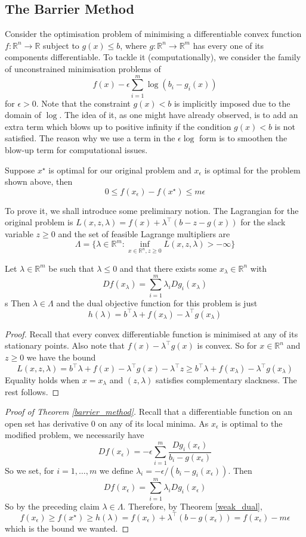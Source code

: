 \subsection{The Barrier Method}
Consider the optimisation problem of minimising a differentiable convex function $f:\mathbb R^n\to\mathbb R$ subject to $g(x)\le b$, where $g:\mathbb R^n\to\mathbb R^m$ has every one of its components differentiable.
To tackle it (computationally), we consider the family of unconstrained minimisation problems of
$$f(x)-\epsilon\sum_{i=1}^m\log(b_i-g_i(x))$$
for $\epsilon>0$.
Note that the constraint $g(x)<b$ is implicitly imposed due to the domain of $\log$.
The idea of it, as one might have already observed, is to add an extra term which blows up to positive infinity if the condition $g(x)<b$ is not satisfied.
The reason why we use a term in the $\epsilon\log$ form is to smoothen the blow-up term for computational issues.
\begin{theorem}\label{barrier_method}
    Suppose $x^\star$ is optimal for our original problem and $x_\epsilon$ is optimal for the problem shown above, then
    $$0\le f(x_\epsilon)-f(x^\star)\le m\epsilon$$
\end{theorem}
To prove it, we shall introduce some preliminary notion.
The Lagrangian for the original problem is $L(x,z,\lambda)=f(x)+\lambda^\top (b-z-g(x))$ for the slack variable $z\ge0$ and the set of feasible Lagrange multipliers are
$$\Lambda=\{\lambda\in\mathbb R^m:\inf_{x\in\mathbb R^n,z\ge 0}L(x,z,\lambda)>-\infty\}$$
\begin{claim}
    Let $\lambda\in\mathbb R^m$ be such that $\lambda\le 0$ and that there exists some $x_\lambda\in\mathbb R^n$ with
    $$Df(x_\lambda)=\sum_{i=1}^m\lambda_iDg_i(x_\lambda)$$s
    Then $\lambda\in\Lambda$ and the dual objective function for this problem is just
    $$h(\lambda)=b^\top\lambda+f(x_\lambda)-\lambda^\top g(x_\lambda)$$
\end{claim}
\begin{proof}
    Recall that every convex differentiable function is minimised at any of its stationary points.
    Also note that $f(x)-\lambda^\top g(x)$ is convex.
    So for $x\in\mathbb R^n$ and $z\ge 0$ we have the bound
    $$L(x,z,\lambda)=b^\top\lambda+f(x)-\lambda^\top g(x)-\lambda^\top z\ge b^\top\lambda+f(x_\lambda)-\lambda^\top g(x_\lambda)$$
    Equality holds when $x=x_\lambda$ and $(z,\lambda)$ satisfies complementary slackness.
    The rest follows.
\end{proof}
\begin{proof}[Proof of Theorem \ref{barrier_method}]
    Recall that a differentiable function on an open set has derivative $0$ on any of its local minima.
    As $x_\epsilon$ is optimal to the modified problem, we necessarily have
    $$Df(x_\epsilon)=-\epsilon\sum_{i=1}^m\frac{Dg_i(x_\epsilon)}{b_i-g(x_\epsilon)}$$
    So we set, for $i=1,\ldots,m$ we define $\lambda_i=-\epsilon/(b_i-g_i(x_\epsilon))$.
    Then
    $$Df(x_\epsilon)=\sum_{i=1}^m\lambda_iDg_i(x_\epsilon)$$
    So by the preceding claim $\lambda\in\Lambda$.
    Therefore, by Theorem \ref{weak_dual},
    $$f(x_\epsilon)\ge f(x^\star)\ge h(\lambda)=f(x_\epsilon)+\lambda^\top(b-g(x_\epsilon))=f(x_\epsilon)-m\epsilon$$
    which is the bound we wanted.
\end{proof}
